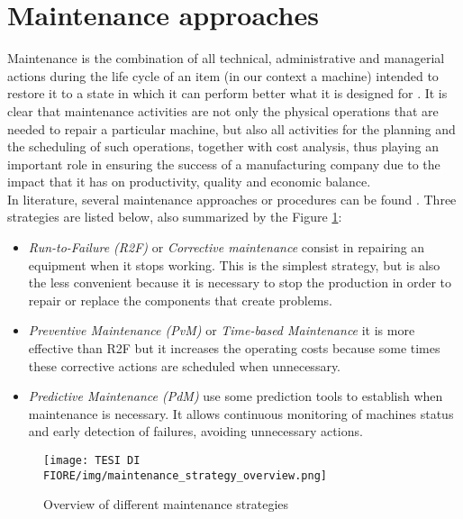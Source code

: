 \section{Maintenance approaches}
Maintenance is the combination of all technical, administrative and managerial actions during the life cycle of an item (in our context a machine) intended to restore it to a state in which it can perform better what it is designed for \cite{4maintenanceTransformation}. It is clear that maintenance activities are not only the physical operations that are needed to repair a particular machine, but also all activities for the planning and the scheduling of such operations, together with cost analysis, thus playing an important role in ensuring the success of a manufacturing company due to the impact that it has on productivity, quality and economic balance.\\
In literature, several maintenance approaches or procedures can be found \cite{3SystematicLiteratureReviewML}. Three strategies are listed below, also summarized by the Figure \ref{maintenance_strategy_overview}:

\begin{itemize}
\item{\textit{Run-to-Failure (R2F)} or \textit{Corrective maintenance} consist in repairing an equipment when it stops working. This is the simplest strategy, but is also the less convenient because it is necessary to stop the production in order to repair or replace the components that create problems.}
\item{\textit{Preventive Maintenance (PvM)} or \textit{Time-based Maintenance} it is more effective than R2F but it increases the operating costs because some times these corrective actions are scheduled when unnecessary.}
\item{\textit{Predictive Maintenance (PdM)} use some prediction tools to establish when maintenance is necessary. It allows continuous monitoring of machines status and early detection of failures, avoiding unnecessary actions.}
\end{itemize}

\begin{figure}[ht]
\texttt{[image: TESI DI FIORE/img/maintenance\_strategy\_overview.png]}
\centering
\caption{Overview of different maintenance strategies \cite{3SystematicLiteratureReviewML}}
\label{maintenance_strategy_overview}
\end{figure}

